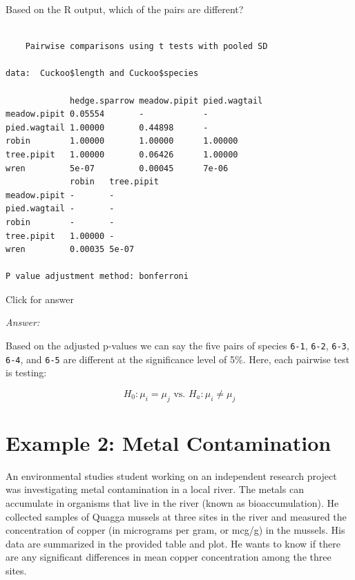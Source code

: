 \documentclass[
]{book}
\newenvironment{Shaded}{\begin{snugshade}}{\end{snugshade}}
\newcommand{\AttributeTok}[1]{\textcolor[rgb]{0.77,0.63,0.00}{#1}}
\newcommand{\FunctionTok}[1]{\textcolor[rgb]{0.00,0.00,0.00}{#1}}
\newcommand{\NormalTok}[1]{#1}
\newcommand{\SpecialCharTok}[1]{\textcolor[rgb]{0.00,0.00,0.00}{#1}}
\newcommand{\StringTok}[1]{\textcolor[rgb]{0.31,0.60,0.02}{#1}}
\begin{document}
Based on the R output, which of the pairs are different?

\begin{Shaded}
\end{Shaded}

\begin{verbatim}

    Pairwise comparisons using t tests with pooled SD 

data:  Cuckoo$length and Cuckoo$species 

             hedge.sparrow meadow.pipit pied.wagtail
meadow.pipit 0.05554       -            -           
pied.wagtail 1.00000       0.44898      -           
robin        1.00000       1.00000      1.00000     
tree.pipit   1.00000       0.06426      1.00000     
wren         5e-07         0.00045      7e-06       
             robin   tree.pipit
meadow.pipit -       -         
pied.wagtail -       -         
robin        -       -         
tree.pipit   1.00000 -         
wren         0.00035 5e-07     

P value adjustment method: bonferroni 
\end{verbatim}

Click for answer

\emph{Answer:}

Based on the adjusted p-values we can say the five pairs of species \texttt{6-1}, \texttt{6-2}, \texttt{6-3}, \texttt{6-4}, and \texttt{6-5} are different at the significance level of 5\%. Here, each pairwise test is testing:

\[H_0: \mu_i = \mu_j \text{ vs. } H_a: \mu_i \neq \mu_j\]

\hypertarget{example-2-metal-contamination}{%
\section{Example 2: Metal Contamination}\label{example-2-metal-contamination}}

An environmental studies student working on an independent research project was investigating metal contamination in a local river. The metals can accumulate in organisms that live in the river (known as bioaccumulation). He collected samples of Quagga mussels at three sites in the river and measured the concentration of copper (in micrograms per gram, or mcg/g) in the mussels. His data are summarized in the provided table and plot. He wants to know if there are any significant differences in mean copper concentration among the three sites.
\end{document}
